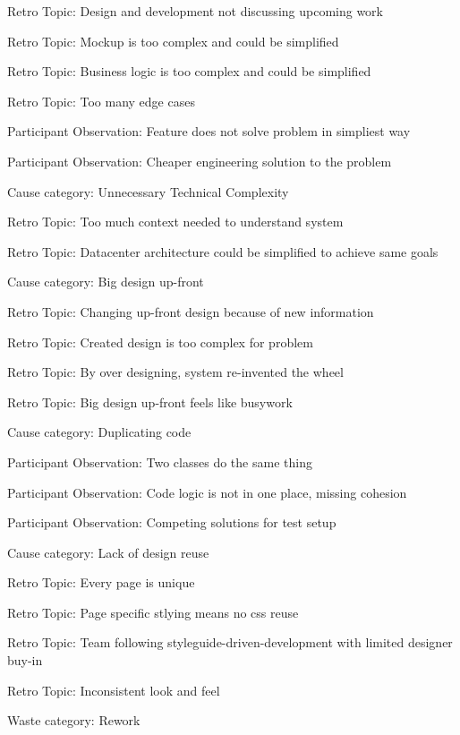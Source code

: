 \quad \quad Retro Topic: Design and development not discussing upcoming work

\quad \quad Retro Topic: Mockup is too complex and could be simplified

\quad \quad Retro Topic: Business logic is too complex and could be simplified

\quad \quad Retro Topic: Too many edge cases

\quad \quad Participant Observation: Feature does not solve problem in simpliest way

\quad \quad Participant Observation: Cheaper engineering solution to the  problem

\quad Cause category: Unnecessary Technical Complexity

\quad \quad Retro Topic: Too much context needed to understand system

\quad \quad Retro Topic: Datacenter architecture could be simplified to achieve same goals

\quad Cause category: Big design up-front

\quad \quad Retro Topic: Changing up-front design because of new information

\quad \quad Retro Topic: Created design is too complex for problem

\quad \quad Retro Topic: By over designing, system re-invented the wheel

\quad \quad Retro Topic: Big design up-front feels like busywork

\quad Cause category: Duplicating code

\quad \quad Participant Observation: Two classes do the same thing

\quad \quad Participant Observation: Code logic is not in one place, missing cohesion

\quad \quad Participant Observation: Competing solutions for test setup

\quad Cause category: Lack of design reuse

\quad \quad Retro Topic: Every page is unique

\quad \quad Retro Topic: Page specific stlying means no css reuse

\quad \quad Retro Topic: Team following styleguide-driven-development with limited designer buy-in

\quad \quad Retro Topic: Inconsistent look and feel



Waste category: Rework

